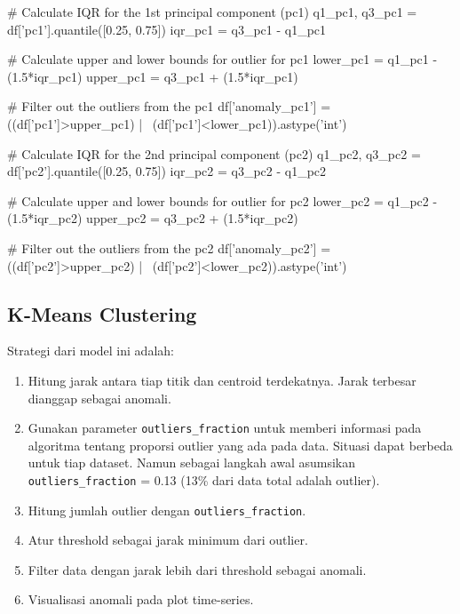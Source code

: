 \begin{python}
# Calculate IQR for the 1st principal component (pc1)
q1_pc1, q3_pc1 = df['pc1'].quantile([0.25, 0.75])
iqr_pc1 = q3_pc1 - q1_pc1

# Calculate upper and lower bounds for outlier for pc1
lower_pc1 = q1_pc1 - (1.5*iqr_pc1)
upper_pc1 = q3_pc1 + (1.5*iqr_pc1)

# Filter out the outliers from the pc1
df['anomaly_pc1'] = ((df['pc1']>upper_pc1) | \
    (df['pc1']<lower_pc1)).astype('int')

# Calculate IQR for the 2nd principal component (pc2)
q1_pc2, q3_pc2 = df['pc2'].quantile([0.25, 0.75])
iqr_pc2 = q3_pc2 - q1_pc2

# Calculate upper and lower bounds for outlier for pc2
lower_pc2 = q1_pc2 - (1.5*iqr_pc2)
upper_pc2 = q3_pc2 + (1.5*iqr_pc2)

# Filter out the outliers from the pc2
df['anomaly_pc2'] = ((df['pc2']>upper_pc2) | \
    (df['pc2']<lower_pc2)).astype('int')
\end{python}

    \subsection{K-Means Clustering}

    Strategi dari model ini adalah:

    \begin{enumerate}
        \item Hitung jarak antara tiap titik dan centroid terdekatnya. Jarak terbesar dianggap sebagai anomali.
        \item Gunakan parameter \texttt{outliers\_fraction} untuk memberi informasi pada algoritma tentang proporsi outlier yang ada pada data. Situasi dapat berbeda untuk tiap dataset. Namun sebagai langkah awal asumsikan \texttt{outliers\_fraction} = 0.13 (13\% dari data total adalah outlier).
        \item Hitung jumlah outlier dengan \texttt{outliers\_fraction}.
        \item Atur threshold sebagai jarak minimum dari outlier.
        \item Filter data dengan jarak lebih dari threshold sebagai anomali.
        \item Visualisasi anomali pada plot time-series.
    \end{enumerate}

